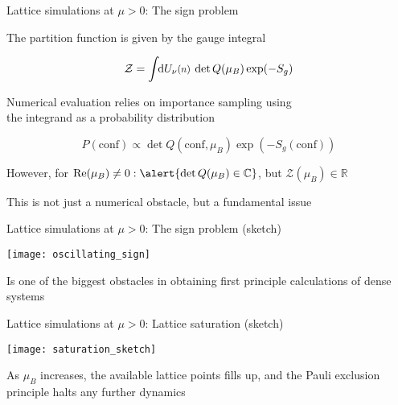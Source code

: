 \begin{frame}{Lattice simulations at \texorpdfstring{$\mu > 0$}{m > 0}: The sign problem}

  The partition function is given by the gauge integral

  \[
    \mathcal{Z} = \int \hspace*{-3pt} \mathrm{d} U_{\nu}\scalemath{0.85}{(n)} \: \det Q (\mu_B) \exp (- S_g )
  \]

  Numerical evaluation relies on \alert{importance sampling} using\\
  the integrand as a probability distribution

  \[
    P(\mathrm{conf}) \propto \det Q (\mathrm{conf}, \mu_B) \exp (-
    S_g(\mathrm{conf}))
  \]

  
  \vspace{.5em}

  However, for $\real(\mu_B) \neq 0: \alert{\det Q(\mu_B) \in \mathbb{C}}$, but
  $\mathcal{Z}(\mu_B) \in \mathbb{R}$

  \vspace{.5em}

  This is not just a numerical obstacle, but a \alert{fundamental issue}
  
\end{frame}

\begin{frame}{Lattice simulations at \texorpdfstring{$\mu > 0$}{m > 0}: The sign problem (sketch)}

  \begin{center}
    \texttt{[image: oscillating\_sign]}
  \end{center}

  \vspace{.5em}

  Is one of the \alert{biggest obstacles} in obtaining first principle calculations of
  dense systems

\end{frame}

\begin{frame}{Lattice simulations at \texorpdfstring{$\mu > 0$}{m > 0}: Lattice saturation (sketch)}

  \begin{center}
    \texttt{[image: saturation\_sketch]}
  \end{center}

  \vspace{-.2cm}

  As $\mu_B$ increases, the available lattice points fills up, and the
  \alert{Pauli exclusion principle} halts any further dynamics
  
\end{frame}



